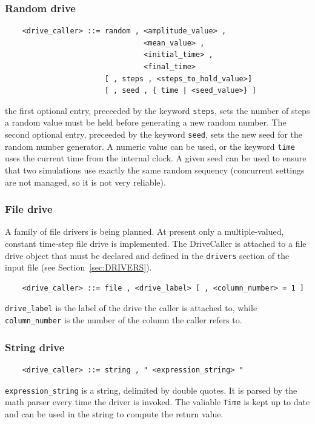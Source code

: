\documentclass[10pt,dvips]{report}
\begin{document}
\subsubsection{Random drive}
\begin{verbatim}
    <drive_caller> ::= random , <amplitude_value> ,
                                <mean_value> ,
                                <initial_time> ,
                                <final_time> 
                       [ , steps , <steps_to_hold_value>]
                       [ , seed , { time | <seed_value>} ]
\end{verbatim}
the first optional entry, preceeded by the keyword {\tt steps}, sets the
number of steps a random value must be held before generating a new
random number. The second optional entry, preceeded by the keyword
{\tt seed}, sets the new seed for the random number generator. A numeric
value can be used, or the keyword {\tt time} uses the current time from
the internal clock. A given seed can be used to ensure that two
simulations use exactly the same random sequency (concurrent settings 
are not managed, so it is not very reliable).

\subsubsection{File drive}
A family of file drivers is being planned.
At present only a multiple-valued, constant time-step file drive is
implemented.
The DriveCaller is attached to a file drive object that must be declared
and defined in the {\tt drivers} section of the input file 
(see Section~\ref{sec:DRIVERS}).
\begin{verbatim}
    <drive_caller> ::= file , <drive_label> [ , <column_number> = 1 ]
\end{verbatim}
{\tt drive\_label} is the label of the drive the caller is attached to, while
{\tt column\_number} is the number of the column the caller refers to.

\subsubsection{String drive}
\begin{verbatim}
    <drive_caller> ::= string , " <expression_string> "
\end{verbatim}
{\tt expression\_string} is a string, delimited by double quotes.
It is parsed by the math parser every time the driver is invoked.
The valiable {\tt Time} is kept up to date and can be used in the 
string to compute the return value.  
\end{document}
